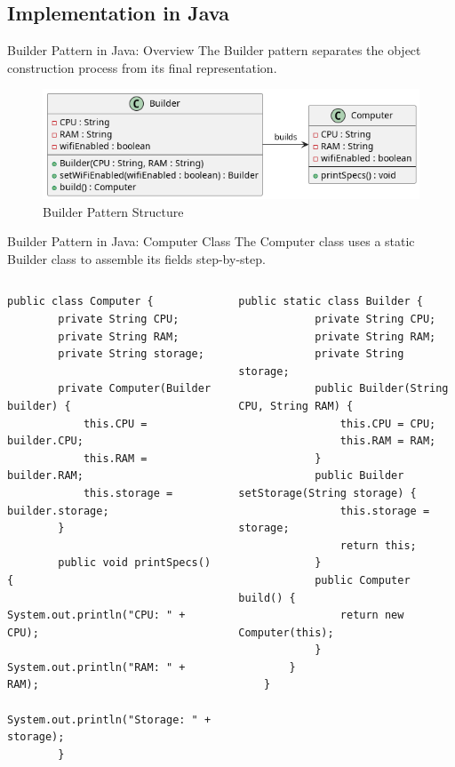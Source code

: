 \documentclass[aspectratio=169, table]{beamer}
\begin{document}
\subsection{Implementation in Java}

\begin{frame}[fragile]{Builder Pattern in Java: Overview}
\vspace{20pt}
The Builder pattern separates the object construction process from its final representation.

\begin{figure}[h]
\centering
\includegraphics[width=.9\textwidth]{../../figures/out/builder.png}
\caption{Builder Pattern Structure}
\label{fig:builder}
\end{figure}
\end{frame}

\begin{frame}[fragile]{Builder Pattern in Java: Computer Class}
\vspace{30pt}
The Computer class uses a static Builder class to assemble its fields step-by-step.

\begin{columns}[T]
\begin{lstlisting}[style=JavaStyle]
	public class Computer {
		private String CPU;
		private String RAM;
		private String storage;
		
		private Computer(Builder builder) {
			this.CPU = builder.CPU;
			this.RAM = builder.RAM;
			this.storage = builder.storage;
		}
		
		public void printSpecs() {
			System.out.println("CPU: " + CPU);
			System.out.println("RAM: " + RAM);
			System.out.println("Storage: " + storage);
		}
	\end{lstlisting}
	
	\begin{lstlisting}[style=JavaStyle]
		public static class Builder {
			private String CPU;
			private String RAM;
			private String storage;
			public Builder(String CPU, String RAM) {
				this.CPU = CPU;
				this.RAM = RAM;
			}
			public Builder setStorage(String storage) {
				this.storage = storage;
				return this;
			}
			public Computer build() {
				return new Computer(this);
			}
		}
	}
\end{lstlisting}
\end{columns}
\end{frame}
\end{document}
